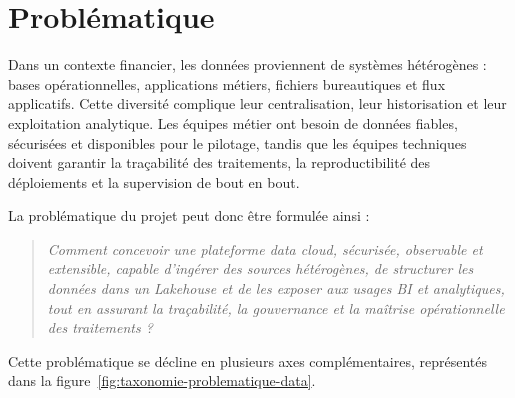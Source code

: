 \section{Problématique}

Dans un contexte financier, les données proviennent de systèmes hétérogènes : bases opérationnelles, applications métiers, fichiers bureautiques et flux applicatifs. Cette diversité complique leur centralisation, leur historisation et leur exploitation analytique. Les équipes métier ont besoin de données fiables, sécurisées et disponibles pour le pilotage, tandis que les équipes techniques doivent garantir la traçabilité des traitements, la reproductibilité des déploiements et la supervision de bout en bout.

La problématique du projet peut donc être formulée ainsi :

\begin{quote}
\itshape
Comment concevoir une plateforme data cloud, sécurisée, observable et extensible, capable d'ingérer des sources hétérogènes, de structurer les données dans un Lakehouse et de les exposer aux usages BI et analytiques, tout en assurant la traçabilité, la gouvernance et la maîtrise opérationnelle des traitements ?
\end{quote}

Cette problématique se décline en plusieurs axes complémentaires, représentés dans la figure~\ref{fig:taxonomie-problematique-data}.

